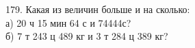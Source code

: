 179. Какая из величин больше и на сколько:\\
а) 20 ч 15 мин 64 с и 74444с?\\
б) 7 т 243 ц 489 кг и 3 т 284 ц 389 кг?\\
